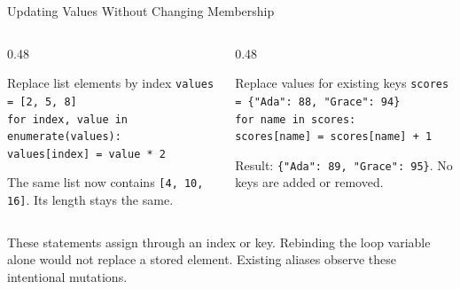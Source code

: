 \documentclass[aspectratio=169,10pt]{beamer}
\begin{document}
\begin{frame}{Updating Values Without Changing Membership}
  \small
  \begin{columns}[T,onlytextwidth]
    \begin{column}{0.48\textwidth}
      \begin{block}{Replace list elements by index}
        \texttt{values = [2, 5, 8]}\\
        \texttt{for index, value in enumerate(values):}\\
        \hspace{0.18in}\texttt{values[index] = value * 2}
      \end{block}
      The same list now contains \texttt{[4, 10, 16]}. Its length stays the same.
    \end{column}
    \begin{column}{0.48\textwidth}
      \begin{block}{Replace values for existing keys}
        \texttt{scores = \{"Ada": 88, "Grace": 94\}}\\
        \texttt{for name in scores:}\\
        \hspace{0.18in}\texttt{scores[name] = scores[name] + 1}
      \end{block}
      Result: \texttt{\{"Ada": 89, "Grace": 95\}}. No keys are added or removed.
    \end{column}
  \end{columns}
  \begin{keyidea}
    These statements assign through an index or key. Rebinding the loop variable alone would not replace a stored element. Existing aliases observe these intentional mutations.
  \end{keyidea}
\end{frame}
\end{document}
